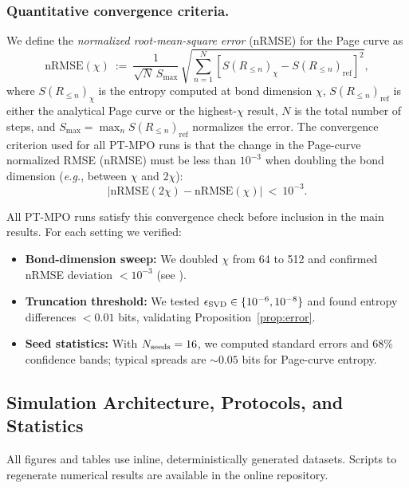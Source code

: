\documentclass[aps,prd,preprint,onecolumn,superscriptaddress,nofootinbib,longbibliography,floatfix,11pt,showpacs,showkeys]{revtex4-2}
\newcommand{\eg}{\textit{e.g.}\xspace}
\theoremstyle{plain}
\theoremstyle{definition}
\theoremstyle{remark}
\begin{document}
\subsubsection{Quantitative convergence criteria.}
We define the \emph{normalized root-mean-square error} (nRMSE) for the Page curve as
\begin{equation}
\mathrm{nRMSE}(\chi) \ :=\ \frac{1}{\sqrt{N}\,S_{\max}}\,\sqrt{\sum_{n=1}^N\left[S(R_{\le n})_{\chi} - S(R_{\le n})_{\mathrm{ref}}\right]^2},
\end{equation}
where $S(R_{\le n})_{\chi}$ is the entropy computed at bond dimension $\chi$, $S(R_{\le n})_{\mathrm{ref}}$ is either the analytical Page curve or the highest-$\chi$ result, $N$ is the total number of steps, and $S_{\max}=\max_n S(R_{\le n})_{\mathrm{ref}}$ normalizes the error. The convergence criterion used for all PT-MPO runs is that the change in the Page-curve normalized RMSE (nRMSE) must be less than $10^{-3}$ when doubling the bond dimension (\eg, between $\chi$ and $2\chi$):
\begin{equation}
\left|\mathrm{nRMSE}(2\chi) - \mathrm{nRMSE}(\chi)\right| \ <\ 10^{-3}.
\end{equation}

All PT-MPO runs satisfy this convergence check before inclusion in the main results. For each setting we verified:
\begin{itemize}[leftmargin=*]
  \item \textbf{Bond-dimension sweep:} We doubled $\chi$ from 64 to 512 and confirmed nRMSE deviation $<10^{-3}$ (see ).
  \item \textbf{Truncation threshold:} We tested $\epsilon_{\rm SVD}\in\{10^{-6},10^{-8}\}$ and found entropy differences $<0.01$ bits, validating Proposition~\ref{prop:error}.
  \item \textbf{Seed statistics:} With $N_{\rm seeds}=16$, we computed standard errors and 68\% confidence bands; typical spreads are $\sim 0.05$ bits for Page-curve entropy.
\end{itemize}

\subsection{Simulation Architecture, Protocols, and Statistics}
\label{sec:methods}
All figures and tables use inline, deterministically generated datasets. Scripts to regenerate numerical results are available in the online repository.
\end{document}
